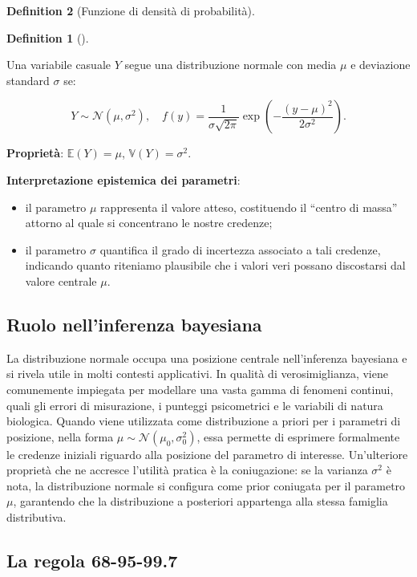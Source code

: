 \documentclass[
  letterpaper,
  DIV=11,
  numbers=noendperiod,
  oneside]{scrreprt}
\providecommand{\tightlist}{%
  \setlength{\itemsep}{0pt}\setlength{\parskip}{0pt}}
\theoremstyle{definition}
\theoremstyle{plain}
\theoremstyle{definition}
\newtheorem{definition}{Definition}[chapter]
\theoremstyle{remark}
\begin{document}
\begin{definition}[Funzione di densità di
probabilità]
\begin{definition}[]\protect\hypertarget{def-normal}{}\label{def-normal}

Una variabile casuale \(Y\) segue una distribuzione normale con media
\(\mu\) e deviazione standard \(\sigma\) se:

\[
Y \sim \mathcal{N}(\mu, \sigma^2), \quad f(y) = \frac{1}{\sigma\sqrt{2\pi}} \exp\left(-\frac{(y - \mu)^2}{2\sigma^2}\right).
\]

\textbf{Proprietà}: \(\mathbb{E}(Y) = \mu\),
\(\mathbb{V}(Y) = \sigma^2\).

\end{definition}

\textbf{Interpretazione epistemica dei parametri}:

\begin{itemize}
\tightlist
\item
  il parametro \(\mu\) rappresenta il valore atteso, costituendo il
  ``centro di massa'' attorno al quale si concentrano le nostre
  credenze;
\item
  il parametro \(\sigma\) quantifica il grado di incertezza associato a
  tali credenze, indicando quanto riteniamo plausibile che i valori veri
  possano discostarsi dal valore centrale \(\mu\).
\end{itemize}

\subsection{Ruolo nell'inferenza
bayesiana}\label{ruolo-nellinferenza-bayesiana-7}

La distribuzione normale occupa una posizione centrale nell'inferenza
bayesiana e si rivela utile in molti contesti applicativi. In qualità di
verosimiglianza, viene comunemente impiegata per modellare una vasta
gamma di fenomeni continui, quali gli errori di misurazione, i punteggi
psicometrici e le variabili di natura biologica. Quando viene utilizzata
come distribuzione a priori per i parametri di posizione, nella forma
\(\mu \sim \mathcal{N}(\mu_0, \sigma_0^2)\), essa permette di esprimere
formalmente le credenze iniziali riguardo alla posizione del parametro
di interesse. Un'ulteriore proprietà che ne accresce l'utilità pratica è
la coniugazione: se la varianza \(\sigma^2\) è nota, la distribuzione
normale si configura come prior coniugata per il parametro \(\mu\),
garantendo che la distribuzione a posteriori appartenga alla stessa
famiglia distributiva.

\subsection{La regola 68-95-99.7}\label{la-regola-68-95-99.7}


\end{definition}
\end{document}
